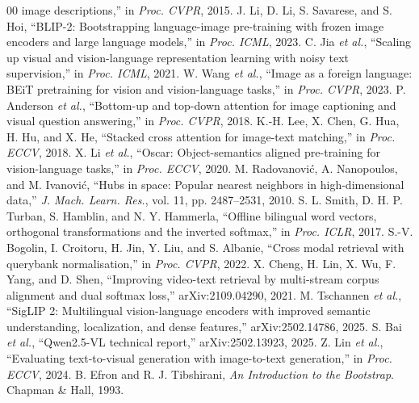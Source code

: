 \documentclass[conference]{IEEEtran}
\begin{document}
\begin{thebibliography}{00}
image descriptions,'' in \emph{Proc. CVPR}, 2015.
 J. Li, D. Li, S. Savarese, and S. Hoi, ``BLIP-2: Bootstrapping language-image
pre-training with frozen image encoders and large language models,'' in \emph{Proc. ICML}, 2023.
 C. Jia \emph{et al.}, ``Scaling up visual and vision-language representation learning
with noisy text supervision,'' in \emph{Proc. ICML}, 2021.
 W. Wang \emph{et al.}, ``Image as a foreign language: BEiT pretraining for vision and
vision-language tasks,'' in \emph{Proc. CVPR}, 2023.
 P. Anderson \emph{et al.}, ``Bottom-up and top-down attention for image captioning
and visual question answering,'' in \emph{Proc. CVPR}, 2018.
 K.-H. Lee, X. Chen, G. Hua, H. Hu, and X. He, ``Stacked cross attention for image-text
matching,'' in \emph{Proc. ECCV}, 2018.
 X. Li \emph{et al.}, ``Oscar: Object-semantics aligned pre-training for vision-language
tasks,'' in \emph{Proc. ECCV}, 2020.
 M. Radovanovi\'c, A. Nanopoulos, and M. Ivanovi\'c, ``Hubs in space: Popular nearest
neighbors in high-dimensional data,'' \emph{J. Mach. Learn. Res.}, vol. 11, pp. 2487--2531, 2010.
 S. L. Smith, D. H. P. Turban, S. Hamblin, and N. Y. Hammerla, ``Offline bilingual word
vectors, orthogonal transformations and the inverted softmax,'' in \emph{Proc. ICLR}, 2017.
 S.-V. Bogolin, I. Croitoru, H. Jin, Y. Liu, and S. Albanie, ``Cross modal retrieval with
querybank normalisation,'' in \emph{Proc. CVPR}, 2022.
 X. Cheng, H. Lin, X. Wu, F. Yang, and D. Shen, ``Improving video-text retrieval by
multi-stream corpus alignment and dual softmax loss,'' arXiv:2109.04290, 2021.
 M. Tschannen \emph{et al.}, ``SigLIP 2: Multilingual vision-language encoders with
improved semantic understanding, localization, and dense features,'' arXiv:2502.14786, 2025.
 S. Bai \emph{et al.}, ``Qwen2.5-VL technical report,'' arXiv:2502.13923, 2025.
 Z. Lin \emph{et al.}, ``Evaluating text-to-visual generation with image-to-text
generation,'' in \emph{Proc. ECCV}, 2024.
 B. Efron and R. J. Tibshirani, \emph{An Introduction to the Bootstrap}. Chapman \&
Hall, 1993.
\end{thebibliography}
\end{document}

